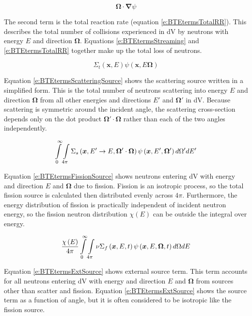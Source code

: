 \begin{equation}\label{e:BTEtermsStreaming}
\bm \Omega \cdot \bm \nabla \psi
\end{equation}

The second term is the total reaction rate (equation \ref{e:BTEtermsTotalRR}).  This describes the total number of collisions experienced in dV by neutrons with energy $E$ and direction $\bm\Omega$.  Equations \ref{e:BTEtermsStreaming} and \ref{e:BTEtermsTotalRR} together make up the total loss of neutrons.

\begin{equation}\label{e:BTEtermsTotalRR}
\Sigma_t\left(\bm x,E\right)\psi\left(\bm x,E\bm\Omega\right)
\end{equation}

Equation \ref{e:BTEtermsScatteringSource} shows the scattering source written in a simplified form.  This is the total number of neutrons scattering into energy $E$ and direction $\bm\Omega$ from all other energies and directions $E'$ and $\bm\Omega'$ in dV.  Because scattering is symmetric around the incident angle, the scattering cross-section depends only on the dot product $\bm\Omega'\cdot\bm\Omega$ rather than each of the two angles independently.

\begin{equation}\label{e:BTEtermsScatteringSource}
\intop_0^{\infty} \intop_{4\pi} \Sigma_s\left(\bm x,E' \rightarrow E, \bm \Omega' \cdot \bm \Omega\right) \psi\left(\bm x,E',\bm \Omega'\right) d\Omega' dE'
\end{equation}

Equation \ref{e:BTEtermsFissionSource} shows neutrons entering dV with energy and direction $E$ and $\bm\Omega$ due to fission.  Fission is an isotropic process, so the total fission source is calculated then distributed evenly across $4\pi$.  Furthermore, the energy distribution of fission is practically independent of incident neutron energy, so the fission neutron distribution $\chi\left(E\right)$ can be outside the integral over energy.

\begin{equation}\label{e:BTEtermsFissionSource}
\frac{\chi\left(E\right)}{4\pi} \intop_0^{\infty} \intop_{4\pi} \nu \Sigma_f\left(\bm x,E,t\right) \psi\left(\bm x,E,\bm \Omega,t\right) d\Omega dE
\end{equation}

Equation \ref{e:BTEtermsExtSource} shows external source term.  This term accounts for all neutrons entering dV with energy and direction $E$ and $\bm\Omega$ from sources other than scatter and fission.  Equation \ref{e:BTEtermsExtSource} shows the source term as a function of angle, but it is often considered to be isotropic like the fission source.

